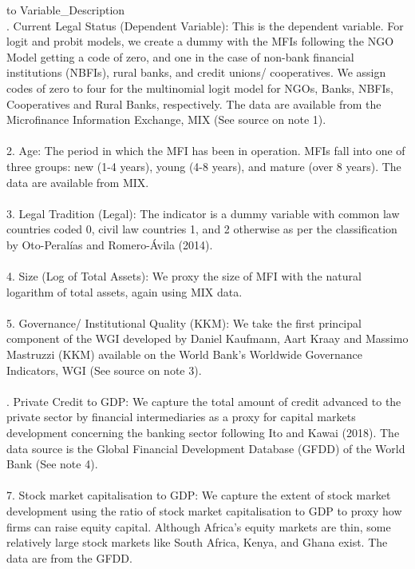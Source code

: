 \documentclass[a4paper,nobind]{templates/ociamthesis}
\begin{document}
\begin{table}

\caption{\label{tab:unnamed-chunk-8}Description of Variables}
\centering
\begin{tabu} to 
\toprule
Variable\_Description\\
. Current Legal Status (Dependent Variable): This is the dependent variable. For logit and probit models, we create a dummy with the MFIs following the NGO Model getting a code of zero, and one in the case of non-bank financial institutions (NBFIs), rural banks, and credit unions/ cooperatives. We assign codes of zero to four for the multinomial logit model for NGOs, Banks, NBFIs, Cooperatives and Rural Banks, respectively. The data are available from the Microfinance Information Exchange, MIX (See source on note 1).\\
\\
2.  Age: The period in which the MFI has been in operation. MFIs fall into one of three groups: new (1-4 years), young (4-8 years), and mature (over 8 years). The data are available from MIX.\\
\\
3. Legal Tradition (Legal): The indicator is a dummy variable with common law countries coded 0, civil law countries 1, and 2 otherwise as per the classification by Oto-Peralías and Romero-Ávila (2014).\\
\addlinespace
\\
4. Size (Log of Total Assets): We proxy the size of MFI with the natural logarithm of total assets, again using MIX data.\\
\\
5. Governance/ Institutional Quality (KKM): We take the first principal component of the WGI developed by Daniel Kaufmann, Aart Kraay and Massimo Mastruzzi (KKM) available on the World Bank's Worldwide Governance Indicators, WGI (See source on note 3).\\
\\
. Private Credit to GDP: We capture the total amount of credit advanced to the private sector by financial intermediaries as a proxy for capital markets development concerning the banking sector following Ito and Kawai (2018). The data source is the Global Financial Development Database (GFDD) of the World Bank (See note 4).\\
\\
7. Stock market capitalisation to GDP: We capture the  extent of stock market development using the ratio of stock market capitalisation to GDP to proxy how firms can raise equity capital. Although Africa's equity markets are thin, some relatively large stock markets like South Africa, Kenya, and Ghana exist. The data are from the GFDD.\\

\end{tabu}
\end{table}
\end{document}
